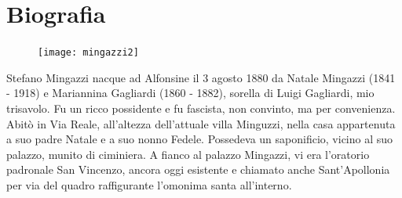 \thispagestyle{empty}
\chapter*{Biografia}


\begin{figure} %
    \centering
    \vspace{-0.4cm}
    \texttt{[image: mingazzi2]}
    \caption[Stefano Mingazzi]{}
    \vspace{-1.1cm}
\end{figure}
Stefano Mingazzi nacque ad Alfonsine il 3 agosto 1880 da Natale Mingazzi (1841 - 1918) e Mariannina Gagliardi (1860 - 1882), sorella di Luigi Gagliardi, mio trisavolo. Fu un ricco possidente e fu fascista, non convinto, ma per convenienza. Abitò in Via Reale, all'altezza dell'attuale villa Minguzzi, nella casa appartenuta a suo padre Natale e a suo nonno Fedele. Possedeva un saponificio, vicino al suo palazzo, munito di ciminiera. A fianco al palazzo Mingazzi, vi era l'oratorio padronale San Vincenzo, ancora oggi esistente e chiamato anche Sant'Apollonia per via del quadro raffigurante l'omonima santa all'interno.

